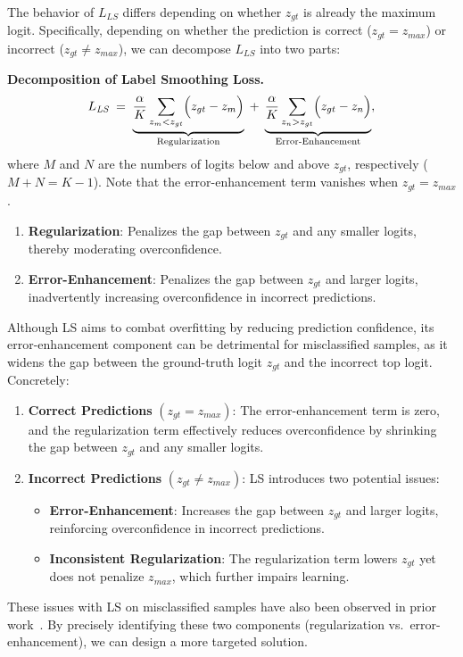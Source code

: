 \noindent
The behavior of \(L_{\textit{LS}}\) differs depending on whether \(z_{gt}\) is already the maximum logit. Specifically, depending on whether the prediction is correct (\(z_{gt} = z_{\textit{max}}\)) or incorrect (\(z_{gt} \neq z_{\textit{max}}\)), we can decompose \(L_{\textit{LS}}\) into two parts:
\begin{corollary}
\label{cor:ls}
\textbf{Decomposition of Label Smoothing Loss.}
\begin{equation}
\label{eq:decomp}
L_{\textit{LS}}
\;=\;
\underbrace{
    \frac{\alpha}{K} \sum_{z_m < z_{gt}} \Bigl(z_{gt} - z_m\Bigr)
}_{\text{Regularization}}
\;+\;
\underbrace{
    \frac{\alpha}{K} \sum_{z_n > z_{gt}} \Bigl(z_{gt} - z_n\Bigr)
}_{\text{Error-Enhancement}},
\end{equation}
where \(M\) and \(N\) are the numbers of logits below and above \(z_{gt}\), respectively (\(M + N = K - 1\)). Note that the error-enhancement term vanishes when \(z_{gt} = z_{\textit{max}}\).
\begin{enumerate}
    \item \textbf{Regularization}: Penalizes the gap between \(z_{gt}\) and any smaller logits, thereby moderating overconfidence.
    \item \textbf{Error-Enhancement}: Penalizes the gap between \(z_{gt}\) and larger logits, inadvertently increasing overconfidence in incorrect predictions.
\end{enumerate}
\end{corollary}

\noindent
Although LS aims to combat overfitting by reducing prediction confidence, its error-enhancement component can be detrimental for misclassified samples, as it widens the gap between the ground-truth logit \(z_{gt}\) and the incorrect top logit. Concretely:
\begin{enumerate}
    \item \textbf{Correct Predictions} \((z_{gt} = z_{\textit{max}})\):
    The error-enhancement term is zero, and the regularization term effectively reduces overconfidence by shrinking the gap between \(z_{gt}\) and any smaller logits.
    
    \item \textbf{Incorrect Predictions} \((z_{gt} \neq z_{\textit{max}})\):
    LS introduces two potential issues:
    \begin{itemize}
        \item \textbf{Error-Enhancement}: Increases the gap between \( z_{gt} \) and larger logits, reinforcing overconfidence in incorrect predictions.
        \item \textbf{Inconsistent Regularization}: The regularization term lowers \(z_{gt}\) yet does not penalize \(z_{\textit{max}}\), which further impairs learning.
    \end{itemize}
\end{enumerate}
\vspace{-2mm}
These issues with LS on misclassified samples have also been observed in prior work~\citep{xia2024understanding}. By precisely identifying these two components (regularization vs.\ error-enhancement), we can design a more targeted solution.

